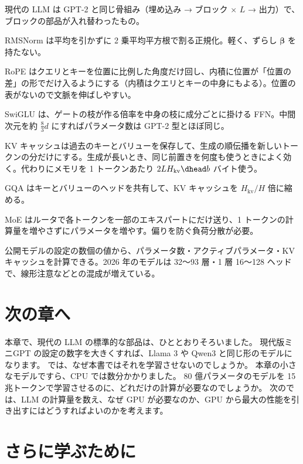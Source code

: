 \begin{summary}
\item 現代の LLM は GPT-2 と同じ骨組み（埋め込み → ブロック × $L$ → 出力）で、ブロックの部品が入れ替わったもの。
\item RMSNorm は平均を引かずに 2 乗平均平方根で割る正規化。軽く、ずらし $\bm\beta$ を持たない。
\item RoPE はクエリとキーを位置に比例した角度だけ回し、内積に位置が「位置の差」の形でだけ入るようにする（内積はクエリとキーの中身にもよる）。位置の表がないので文脈を伸ばしやすい。
\item SwiGLU は、ゲートの枝が作る倍率を中身の枝に成分ごとに掛ける FFN。中間次元を約 $\tfrac83 d$ にすればパラメータ数は GPT-2 型とほぼ同じ。
\item KV キャッシュは過去のキーとバリューを保存して、生成の順伝播を新しいトークンの分だけにする。生成が長いとき、同じ前置きを何度も使うときによく効く。代わりにメモリを 1 トークンあたり $2LH_{\mathrm{kv}}\dhead b$ バイト使う。
\item GQA はキーとバリューのヘッドを共有して、KV キャッシュを $H_{\mathrm{kv}}/H$ 倍に縮める。
\item MoE はルータで各トークンを一部のエキスパートにだけ送り、1 トークンの計算量を増やさずにパラメータを増やす。偏りを防ぐ負荷分散が必要。
\item 公開モデルの設定の数個の値から、パラメータ数・アクティブパラメータ・KV キャッシュを計算できる。2026 年のモデルは 32〜93 層・1 層 16〜128 ヘッドで、線形注意などとの混成が増えている。
\end{summary}

\section*{次の章へ}

本章で、現代の LLM の標準的な部品は、ひととおりそろいました。
現代版ミニGPT の設定の数字を大きくすれば、Llama 3 や Qwen3 と同じ形のモデルになります。
では、なぜ本書ではそれを学習させないのでしょうか。
本章の小さなモデルですら、CPU では数分かかりました。
80 億パラメータのモデルを 15 兆トークンで学習させるのに、どれだけの計算が必要なのでしょうか。
次のでは、LLM の計算量を数え、なぜ GPU が必要なのか、GPU から最大の性能を引き出すにはどうすればよいのかを考えます。

\section*{さらに学ぶために}

